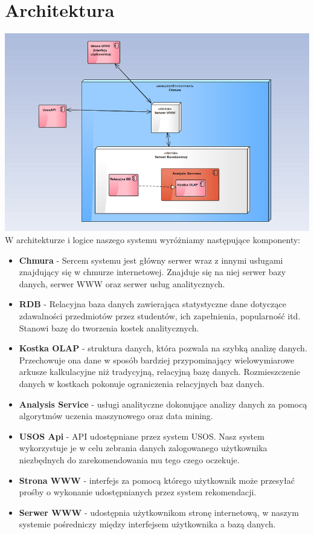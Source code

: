 \documentclass[licencjacka]{pracamgr}
\begin{document}
 \chapter{Architektura}
 \includegraphics[scale=1]{Architektura.png}\newline
 W architekturze i logice naszego systemu wyróżniamy następujące komponenty:
 \begin{itemize}
 
\item \textbf{Chmura} - Sercem systemu jest główny serwer wraz z innymi usługami znajdujący się w chmurze internetowej. Znajduje się na niej serwer bazy danych, serwer WWW oraz serwer usług analitycznych.

\item \textbf {RDB} - Relacyjna baza danych zawierająca statystyczne dane dotyczące zdawalności przedmiotów przez studentów, ich zapełnienia, popularność itd. Stanowi bazę do tworzenia kostek analitycznych. 

\item \textbf {Kostka OLAP} - struktura danych, która pozwala na szybką analizę danych. Przechowuje ona dane w sposób bardziej przypominający wielowymiarowe arkusze kalkulacyjne niż tradycyjną, relacyjną bazę danych. Rozmieszczenie danych w kostkach pokonuje ograniczenia relacyjnych baz danych.

\item \textbf{Analysis Service} - usługi analityczne dokonujące analizy danych za pomocą algorytmów uczenia maszynowego oraz data mining.
 
\item \textbf{USOS Api} - API udostępniane przez system USOS. Nasz system wykorzystuje je w celu zebrania danych zalogowanego użytkownika niezbędnych do zarekomendowania mu tego czego oczekuje.

\item \textbf{Strona WWW} - interfejs za pomocą którego użytkownik może przesyłać prośby o wykonanie udostępnianych przez system rekomendacji.

\item \textbf{Serwer WWW} - udostępnia użytkownikom stronę internetową, w naszym systemie pośredniczy między interfejsem użytkownika a bazą danych.
  
\end{itemize}
\end{document}
